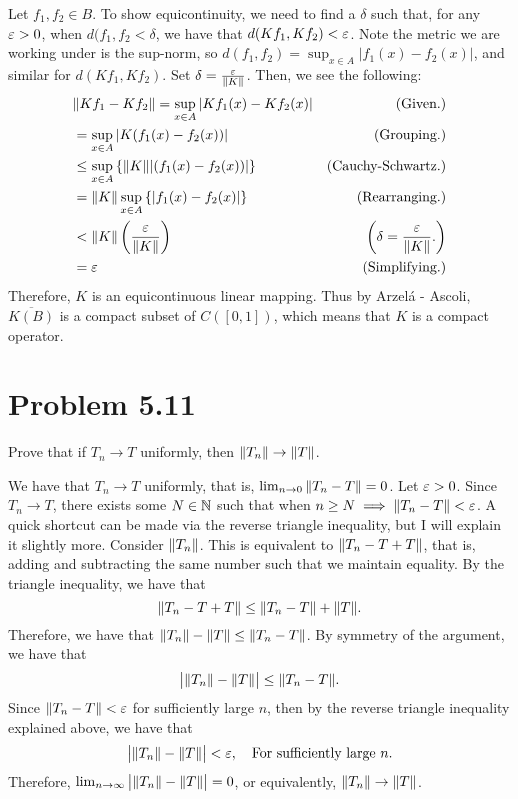 \begin{solution}
\begin{itemize}[-]
        \hop
        Let $f_1, f_2 \in B$. To show equicontinuity, we need to find a $\delta$ such that, for any $\varepsilon > 0$, when $d(f_1, f_2 < \delta$, we have that $d(Kf_1, Kf_2) < \varepsilon$. Note the metric we are working under is the sup-norm, so $d(f_1, f_2) = \sup_{x \in A} |f_1(x) - f_2(x)|$, and similar for $d(Kf_1, Kf_2)$. Set $\delta = \frac{\varepsilon}{\norm{K}}$. Then, we see the following:
        \newpage
        \tightalignbreak
        \begin{align*}
            &\norm{Kf_1 - Kf_2} =\sup_{x \in A}\left|Kf_1(x) - Kf_2(x)\right| &\text{(Given.)}\\
            &= \sup_{x \in A}\left|K(f_1(x) - f_2(x))\right| &\text{(Grouping.)}\\
            &\leq \sup_{x \in A}\left\{ \norm{K}|(f_1(x) - f_2(x))|\right\} &\text{(Cauchy-Schwartz.)}\\
            &= \norm{K} \sup_{x \in A}\left\{ |f_1(x) - f_2(x)|\right\} &\text{(Rearranging.)}\\
            &< \norm{K}\left( \frac{\varepsilon}{\norm{K}}\right) &\left(\delta = \frac{\varepsilon}{\norm{K}}.\right)\\
            &= \varepsilon &\text{(Simplifying.)}
        \end{align*}
        \vspace{-12mm}\alignbreak
        Therefore, $K$ is an equicontinuous linear mapping. Thus by Arzel\'a - Ascoli, $\overline{K(B)}$ is a compact subset of $C([0, 1])$, which means that $K$ is a compact operator. 
        
    \end{itemize}
\end{solution}
\newpage
\section{Problem 5.11}
Prove that if $T_n \rightarrow T$ uniformly, then $\norm{T_n} \rightarrow \norm{T}$.
\partbreak
\begin{solution}

    We have that $T_n \rightarrow T$ uniformly, that is, $\lim_{n \rightarrow 0} \norm{T_n - T} = 0$. Let $\varepsilon > 0$. Since $T_n \rightarrow T$, there exists some $N \in \mathbb{N}$ such that when $n \geq N \implies \norm{T_n - T} < \varepsilon$. A quick shortcut can be made via the reverse triangle inequality, but I will explain it slightly more. Consider $\norm{T_n}$. This is equivalent to $\norm{T_n - T + T}$, that is, adding and subtracting the same number such that we maintain equality. By the triangle inequality, we have that 
    \[\norm{T_n - T + T} \leq \norm{T_n - T} + \norm{T}.\]
    Therefore, we have that $\norm{T_n} - \norm{T} \leq \norm{T_n - T}$. By symmetry of the argument, we have that 
    \[\big|\norm{T_n} - \norm{T}\big| \leq \norm{T_n - T}.\]
    Since $\norm{T_n - T} < \varepsilon$ for sufficiently large $n$, then by the reverse triangle inequality explained above, we have that 
    \[\big| \norm{T_n} - \norm{T} \big| < \varepsilon, \quad \text{For sufficiently large $n$.}\]
    Therefore, $\lim_{n\rightarrow\infty} \big|\norm{T_n} - \norm{T}\big| = 0$, or equivalently, $\norm{T_n} \rightarrow \norm{T}$.
\end{solution}
\newpage
